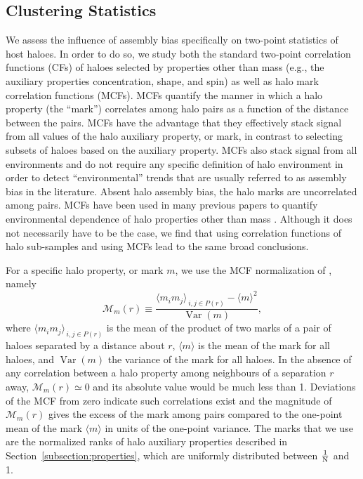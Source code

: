 \documentclass[usenatbib,fleqn]{mnras}
\begin{document}
\subsection{Clustering Statistics}
\label{subsection:clusteringstatistics}


We assess the influence of assembly bias specifically on two-point statistics of host haloes. In order to do so, we study both the standard two-point correlation functions (CFs) of haloes selected by properties other than mass (e.g., the auxiliary properties concentration, shape, and spin) as well as halo mark correlation functions (MCFs). MCFs quantify the manner in which a halo property (the ``mark'') correlates among halo pairs as a function of the distance between the pairs. MCFs have the advantage that they effectively stack signal from all values of the halo auxiliary property, or mark, in contrast to selecting subsets of haloes based on the auxiliary property. MCFs also stack signal from all environments and do not require any specific definition of halo environment in order to detect ``environmental'' trends that are usually referred to as assembly bias in the literature. Absent halo assembly bias, the halo marks are uncorrelated among pairs. MCFs have been used in many previous papers to quantify environmental dependence of halo properties other than mass \citep{beisbart_kerscher2000,faltenbacher_etal02,sheth_tormen04,sheth05, skibba_etal06, harker_etal06,wechsler_etal06,mao_etal15}. Although it does not necessarily have to be the case, we find that using correlation functions of halo sub-samples and using MCFs lead to the same broad conclusions. 

For a specific halo property, or mark $m$, we use the MCF normalization of \citet{wechsler_etal06}, namely 
%
\begin{equation}
\label{eq:mcf}
\mathcal{M}_m(r) \equiv \frac{\langle m_i m_j \rangle_{\,i,j \in P(r)} - 
\langle m \rangle^2}{\operatorname{Var}(m)},
\end{equation}
%
where $\langle m_i m_j \rangle_{\,i,j \in P(r)}$ is the mean of the product of two marks of a pair of haloes separated by a distance about $r$, $\langle m \rangle$ is the mean of the mark for all haloes, and $\operatorname{Var}(m)$ the variance of the mark for all haloes.
In the absence of any correlation between a halo property among neighbours of a separation $r$ away, $\mathcal{M}_m(r) \simeq 0$ and its absolute value would be much less than 1. Deviations of the MCF from zero indicate such correlations exist and the magnitude of $\mathcal{M}_m(r)$ gives the excess of the mark among pairs compared to the one-point mean of the mark $\langle m\rangle$ in units of the one-point variance. The marks that we use are the normalized ranks of halo auxiliary properties described in Section~\ref{subsection:properties}, which are uniformly distributed between $\frac{1}{{\rm N}}$ and 1.
\end{document}
